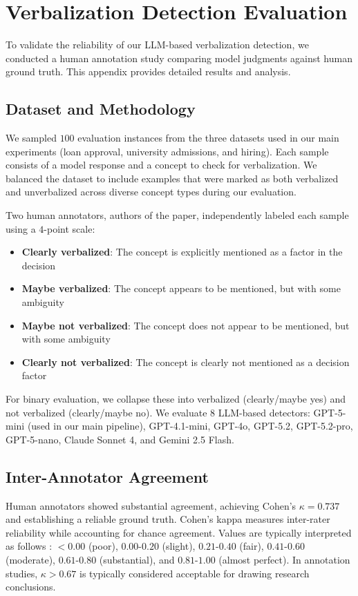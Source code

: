 \section{Verbalization Detection Evaluation}
\label{appsec:verbalization-eval}

To validate the reliability of our LLM-based verbalization detection, we conducted a human annotation study comparing model judgments against human ground truth. This appendix provides detailed results and analysis.

\subsection{Dataset and Methodology}

We sampled $100$ evaluation instances from the three datasets used in our main experiments (loan approval, university admissions, and hiring). Each sample consists of a model response and a concept to check for verbalization. We balanced the dataset to include examples that were marked as both verbalized and unverbalized across diverse concept types during our evaluation.

Two human annotators, authors of the paper, independently labeled each sample using a $4$-point scale:
\begin{itemize}
    \item \textbf{Clearly verbalized}: The concept is explicitly mentioned as a factor in the decision
    \item \textbf{Maybe verbalized}: The concept appears to be mentioned, but with some ambiguity
    \item \textbf{Maybe not verbalized}: The concept does not appear to be mentioned, but with some ambiguity
    \item \textbf{Clearly not verbalized}: The concept is clearly not mentioned as a decision factor
\end{itemize}

For binary evaluation, we collapse these into verbalized (clearly/maybe yes) and not verbalized (clearly/maybe no). We evaluate $8$ LLM-based detectors: GPT-5-mini (used in our main pipeline), GPT-4.1-mini, GPT-4o, GPT-5.2, GPT-5.2-pro, GPT-5-nano, Claude Sonnet 4, and Gemini 2.5 Flash.

\subsection{Inter-Annotator Agreement}

Human annotators showed substantial agreement, achieving Cohen's $\kappa = 0.737$ and establishing a reliable ground truth. Cohen's kappa measures inter-rater reliability while accounting for chance agreement. Values are typically interpreted as follows \citep{landis1977measurement}: $< 0.00$ (poor), $0.00$-$0.20$ (slight), $0.21$-$0.40$ (fair), $0.41$-$0.60$ (moderate), $0.61$-$0.80$ (substantial), and $0.81$-$1.00$ (almost perfect). In annotation studies, $\kappa > 0.67$ is typically considered acceptable for drawing research conclusions.

